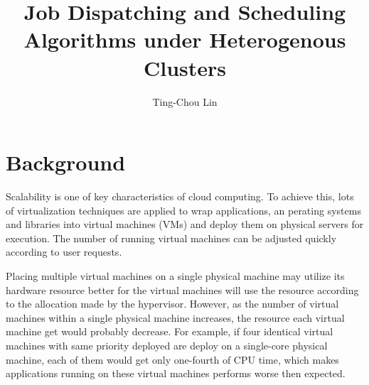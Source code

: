 \documentclass[11pt]{article}
\title{\textbf{Job Dispatching and Scheduling Algorithms under Heterogenous Clusters}}
\author{Ting-Chou Lin\\}
\date{}
\begin{document}
\maketitle

\section{Background}

Scalability is one of key characteristics of cloud
computing.  To achieve this, lots of virtualization
techniques\cite{secure_virt_for_cloud}\cite{cloud_issue} are applied to wrap
applications, an perating systems and libraries into virtual machines (VMs) and
deploy them on physical servers for execution.  The number of running virtual
machines can be adjusted quickly according to user requests.  

Placing multiple virtual machines on a single physical machine may utilize its
hardware resource better for the virtual machines will use the resource
according to the allocation made by the hypervisor.  However, as the number of
virtual machines within a single physical machine increases, the resource each
virtual machine get would probably decrease\cite{resource_overbooking}.  For example, if four identical
virtual machines with same priority deployed are deploy on a single-core
physical machine, each of them would get only one-fourth of CPU time, which
makes applications running on these virtual machines performs worse then
expected.


\renewcommand\refname{Reference}


\end{document}
